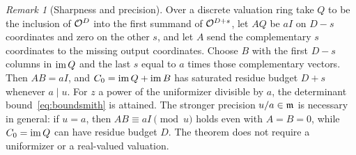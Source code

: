 \documentclass[11pt]{article}
\theoremstyle{remark}\newtheorem{remark}[theorem]{Remark}
\begin{document}
\begin{remark}[Sharpness and precision]
Over a discrete valuation ring take $Q$ to be the inclusion of $\mathcal O^D$ into the first summand of $\mathcal O^{D+s}$, let $AQ$ be $aI$ on $D-s$ coordinates and zero on the other $s$, and let $A$ send the complementary $s$ coordinates to the missing output coordinates. Choose $B$ with the first $D-s$ columns in $\operatorname{im} Q$ and the last $s$ equal to $a$ times those complementary vectors. Then $AB=aI$, and $C_0=\operatorname{im} Q+\operatorname{im} B$ has saturated residue budget $D+s$ whenever $a\mid u$. For $z$ a power of the uniformizer divisible by $a$, the determinant bound~\eqref{eq:boundsmith} is attained. The stronger precision $u/a\in\mathfrak m$ is necessary in general: if $u=a$, then $AB\equiv aI\pmod u$ holds even with $A=B=0$, while $C_0=\operatorname{im} Q$ can have residue budget $D$. The theorem does not require a uniformizer or a real-valued valuation.
\end{remark}
\end{document}
